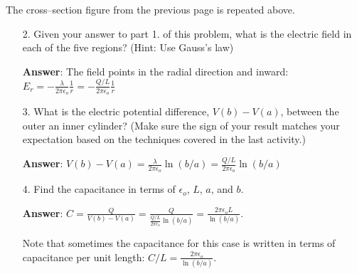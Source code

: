 \documentclass{article}
\newcommand{\ds}[0]{\displaystyle}
\begin{document}
\ifsolutions

\else



The cross--section figure from the previous page is repeated above.
\fi

\begin{enumerate}

  \item[2.] Given your answer to part 1. of this problem, what is the electric field in each of the five regions? (Hint: Use Gauss's law)

            \ifsolutions
            \textbf{Answer}: The field points in the radial direction and inward: $\ds E_r = -\frac{\lambda }{2\pi\epsilon_o}\frac{1}{r} = -\frac{Q/L}{2\pi\epsilon_o}\frac{1}{r}$
            \else
            \vskip 96pt
            \fi

  \item[3.] What is the electric potential difference, $V(b)-V(a)$, between the outer an inner cylinder? (Make sure the sign of your result matches your expectation based on the techniques covered in the last activity.)

            \ifsolutions
            \textbf{Answer}: $\ds V(b)-V(a) =  \frac{\lambda}{2\pi\epsilon_o}\ln(b/a) = \frac{Q/L}{2\pi\epsilon_o}\ln(b/a) $
            \else
            \vskip 96pt
            \fi

  \item[4.] Find the capacitance in terms of $\epsilon_o$, $L$, $a$, and $b$.

            \ifsolutions
            \textbf{Answer}: $\displaystyle C= \frac{Q}{V(b)-V(a)} = \frac{Q}{\frac{Q/L}{2\pi\epsilon_o}\ln(b/a)}=\frac{2\pi \epsilon_o L}{\ln(b/a)}$.

            Note that sometimes the capacitance for this case is written in terms of capacitance per unit length: $\ds C/L=\frac{2\pi \epsilon_o}{\ln(b/a)}$.
            \else
            \vskip 120pt
            \fi

\end{enumerate}
\end{document}
